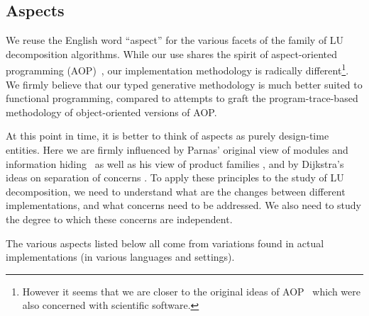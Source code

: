\documentclass{elsart}
\begin{document}
\subsection{Aspects}\label{sec:aspects}

We reuse the English word ``aspect'' for the various facets of the family
of LU decomposition algorithms.  While our use shares the 
spirit of aspect-oriented programming (AOP)~\cite{kiczales97aspectoriented},
our implementation methodology is radically different\footnote{However it seems
that we are closer to the original ideas of AOP~\cite{709568,mendhekar97rg}
which were also concerned with scientific software.}.  We firmly believe that
our typed generative methodology is much better suited to functional
programming, compared to attempts to graft the program-trace-based
methodology of object-oriented versions of AOP.  

At this point in time, it is better to think of aspects as purely
design-time entities.  Here we are firmly influenced by Parnas' original
view of modules and information hiding~\cite{journals/cacm/parnas72a} as well
as his view of product families \cite{journals/tse/Parnas76}, and by
Dijkstra's ideas on separation of concerns \cite{EWD:EWD447}.
To apply these principles to the study of LU decomposition, we need
to understand what are the changes between different implementations, and 
what concerns need to be addressed.  We also need to study the degree
to which these concerns are independent.

The various aspects listed below all come from variations found in actual
implementations (in various languages and settings).
\end{document}

